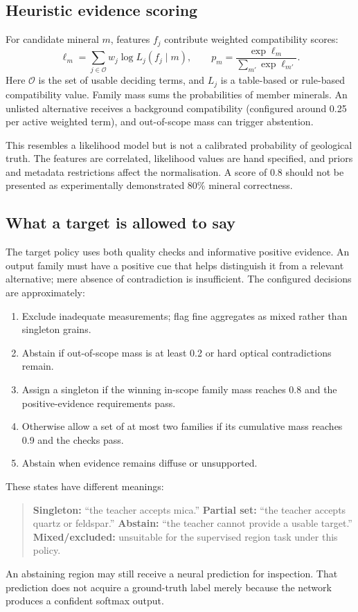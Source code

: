 \subsection{Heuristic evidence scoring}
For candidate mineral $m$, features $f_j$ contribute weighted compatibility scores:
\begin{equation}
\ell_m=\sum_{j\in\mathcal O}w_j\log L_j(f_j\mid m),\qquad
p_m=\frac{\exp\ell_m}{\sum_{m'}\exp\ell_{m'}}.
\end{equation}
Here $\mathcal O$ is the set of usable deciding terms, and $L_j$ is a table-based or rule-based compatibility value. Family mass sums the probabilities of member minerals. An unlisted alternative receives a background compatibility (configured around 0.25 per active weighted term), and out-of-scope mass can trigger abstention.

This resembles a likelihood model but is not a calibrated probability of geological truth. The features are correlated, likelihood values are hand specified, and priors and metadata restrictions affect the normalisation. A score of 0.8 should not be presented as experimentally demonstrated 80\% mineral correctness.

\subsection{What a target is allowed to say}
The target policy uses both quality checks and informative positive evidence. An output family must have a positive cue that helps distinguish it from a relevant alternative; mere absence of contradiction is insufficient. The configured decisions are approximately:
\begin{enumerate}
\item Exclude inadequate measurements; flag fine aggregates as mixed rather than singleton grains.
\item Abstain if out-of-scope mass is at least 0.2 or hard optical contradictions remain.
\item Assign a singleton if the winning in-scope family mass reaches 0.8 and the positive-evidence requirements pass.
\item Otherwise allow a set of at most two families if its cumulative mass reaches 0.9 and the checks pass.
\item Abstain when evidence remains diffuse or unsupported.
\end{enumerate}
These states have different meanings:
\begin{quote}
\textbf{Singleton:} ``the teacher accepts mica.''\quad
\textbf{Partial set:} ``the teacher accepts quartz or feldspar.''\quad
\textbf{Abstain:} ``the teacher cannot provide a usable target.''\quad
\textbf{Mixed/excluded:} unsuitable for the supervised region task under this policy.
\end{quote}
An abstaining region may still receive a neural prediction for inspection. That prediction does not acquire a ground-truth label merely because the network produces a confident softmax output.

